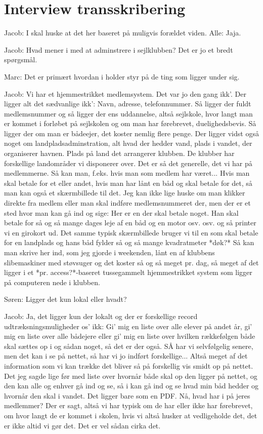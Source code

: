 \section{Interview transskribering}\label{bilag:interview-transkribering}
Jacob: I skal huske at det her baseret på muligvis forældet viden.
Alle: Jaja.

Jacob: Hvad mener i med at adminstrere i sejlklubben? Det er jo et bredt spørgsmål.

Marc: Det er primært hvordan i holder styr på de ting som ligger under sig.

Jacob: Vi har et hjemmestrikket medlemsystem. Det var jo den gang ikk'. Der ligger alt det sædvanlige ikk': Navn, adresse, telefonnummer. Så ligger der fuldt medlemsnummer og så ligger der ens uddannelse, altså sejlskole, hvor langt man er kommet i forløbet på sejlskolen og om man har førebrevet, duelighedsbevis. Så ligger der om man er bådeejer, det koster nemlig flere penge. Der ligger vidst også noget om landpladsadminstration, alt hvad der hedder vand, plads i vandet, der organiserer havnen. Plads på land det arrangerer klubben. De klubber har forskellige landområder vi disponerer over. Det er så det generelle, det vi har på medlemmerne.
Så kan man, f.eks. hvis man som medlem har været... Hvis man skal betale for et eller andet, hvis man har lånt en båd og skal betale for det, så man kan også et skærmbillede til det. Jeg kan ikke lige huske om man klikker direkte fra medlem eller man skal indføre medlemsnummeret der, men der er et sted hvor man kan gå ind og sige: Her er en der skal betale noget. Han skal betale for så og så mange dages leje af en båd og en motor osv. osv. og så printer vi en girokort ud. Det samme typisk skærmbillede bruger vi til en som skal betale for en landplads og hans båd fylder så og så mange kvadratmeter *døk?* Så kan man skrive her ind, som jeg gjorde i weekenden, lånt en af klubbens slibemaskiner med støvsuger og det koster så og så meget pr. dag, så meget af det ligger i et *pr. access?*-baseret tussegammelt hjemmestrikket system som ligger på computeren nede i klubben.

Søren: Ligger det kun lokal eller hvadt?

Jacob: Ja, det ligger kun der lokalt og der er forskellige record udtræksningsmuligheder os' ikk: Gi' mig en liste over alle elever på andet år, gi' mig en liste over alle bådejere eller gi' mig en liste over hvilken rækkefølgen både skal sættes op i og sådan noget, så det er der også. SÅ har vi selvfølgelig senere, men det kan i se på nettet, så har vi jo indført forskellige... Altså meget af det information som vi kan trække det bliver så på forskellig vis smidt op på nettet. Det jeg sagde lige før med liste over hvornår både skal op den ligger på nettet, og den kan alle og enhver gå ind og se, så i kan gå ind og se hvad min båd hedder og hvornår den skal i vandet. Det ligger bare som en PDF. 
Nå, hvad har i på jeres medlemmer? Der er sagt, altså vi har typisk om de har eller ikke har førebrevet, om hvor langt de er kommet i skolen, hvis vi altså husker at vedligeholde det, det er ikke altid vi gør det. Det er vel sådan cirka det. 

